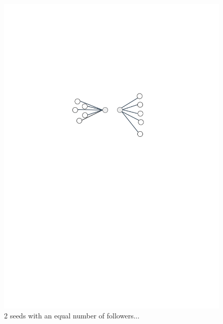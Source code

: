  \begin{figure}
 \begin{center}
 	\begin{subtable}{1\textwidth}
 	    \centering
        \includegraphics[scale=.6]{figures/followers/follower1}
        \caption{2 seeds with an equal number of followers...}
        \label{fig:follower1}
    \end{subtable}
     \begin{subtable}{1\textwidth}
        \centering

\end{subtable}
\end{center}
\end{figure}
